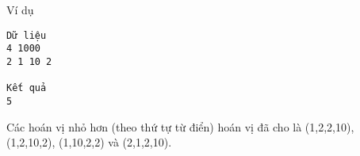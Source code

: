 Ví dụ  
\begin{verbatim}
Dữ liệu
4 1000 
2 1 10 2 

Kết quả
5
\end{verbatim}

   Các hoán vị nhỏ hơn (theo thứ tự từ điển) hoán vị đã cho là (1,2,2,10), (1,2,10,2), (1,10,2,2) và (2,1,2,10).